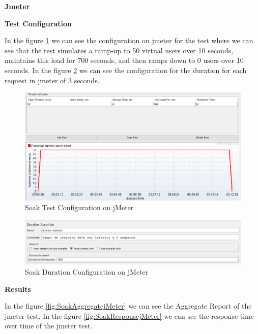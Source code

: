 \documentclass[a4paper,11pt,openright,BCOR=15mm]{scrbook}
\begin{document}
\textbf{Jmeter}





\textbf{Test Configuration}



In the figure \ref{fig:SoakConfigurationjMeter} we can see the configuration on jmeter for the test where we can see that the test simulates a ramp-up to 50 virtual users over 10 seconds, maintains this load for 700 seconds, and then ramps down to 0 users over 10 seconds. In the figure \ref{fig:SoakDurationjMeter} we can see the configuration for the duration for each request in jmeter of 3 seconds.



\begin{figure}[H]
	\centering
	\includegraphics[width=\textwidth]{figs/Performance/jmeter/SoakJmeterConfiguration.png}
	\caption{Soak Test Configuration on jMeter}
	\label{fig:SoakConfigurationjMeter}
\end{figure}

\begin{figure}[H]
	\centering
	\includegraphics[width=\textwidth]{figs/Performance/jmeter/Load-SoakJmeterDurationAssertion.png}
	\caption{Soak Duration Configuration on jMeter}
	\label{fig:SoakDurationjMeter}
\end{figure}




\textbf{Results}

In the figure \ref{fig:SoakAggregatejMeter} we can see the Aggregate Report of the jmeter test. In the figure \ref{fig:SoakResponsejMeter} we can see the response time over time of the jmeter test.
\end{document}
